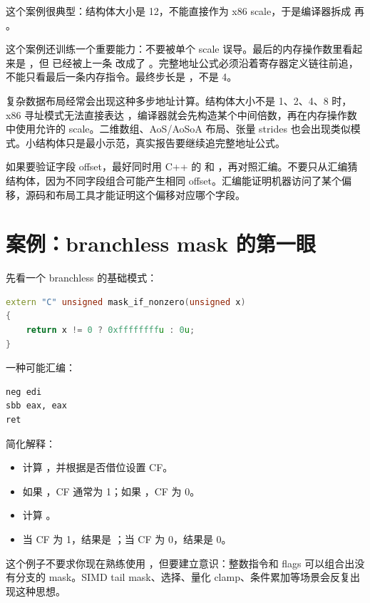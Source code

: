 这个案例很典型：结构体大小是 12，不能直接作为 x86 scale，于是编译器拆成  再 。

这个案例还训练一个重要能力：不要被单个 scale 误导。最后的内存操作数里看起来是 ，但  已经被上一条  改成了 。完整地址公式必须沿着寄存器定义链往前追，不能只看最后一条内存指令。最终步长是 ，不是 4。

复杂数据布局经常会出现这种多步地址计算。结构体大小不是 1、2、4、8 时，x86 寻址模式无法直接表达 ，编译器就会先构造某个中间倍数，再在内存操作数中使用允许的 scale。二维数组、AoS/AoSoA 布局、张量 strides 也会出现类似模式。小结构体只是最小示范，真实报告要继续追完整地址公式。

如果要验证字段 offset，最好同时用 C++ 的  和 ，再对照汇编。不要只从汇编猜结构体，因为不同字段组合可能产生相同 offset。汇编能证明机器访问了某个偏移，源码和布局工具才能证明这个偏移对应哪个字段。

\section{案例：branchless mask 的第一眼}

先看一个 branchless 的基础模式：

\begin{lstlisting}[language=C++]
extern "C" unsigned mask_if_nonzero(unsigned x)
{
    return x != 0 ? 0xffffffffu : 0u;
}
\end{lstlisting}

一种可能汇编：

\begin{lstlisting}
neg edi
sbb eax, eax
ret
\end{lstlisting}

简化解释：

\begin{itemize}
  \item {} 计算 ，并根据是否借位设置 CF。
  \item 如果 ，CF 通常为 1；如果 ，CF 为 0。
  \item {} 计算 。
  \item 当 CF 为 1，结果是 ；当 CF 为 0，结果是 0。
\end{itemize}

这个例子不要求你现在熟练使用 ，但要建立意识：整数指令和 flags 可以组合出没有分支的 mask。SIMD tail mask、选择、量化 clamp、条件累加等场景会反复出现这种思想。

